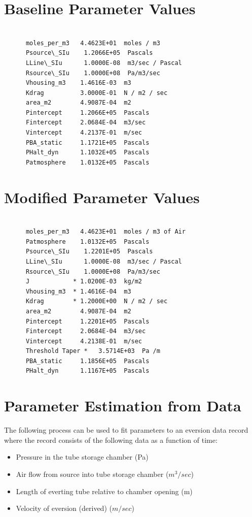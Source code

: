\documentclass[letterpaper]{article}
\begin{document}
\clearpage

\section{Baseline Parameter Values}\label{baselineParms}
\begin{verbatim}

      moles_per_m3   4.4623E+01  moles / m3
      Psource\_SIu    1.2066E+05  Pascals
      LLine\_SIu      1.0000E-08  m3/sec / Pascal
      Rsource\_SIu    1.0000E+08  Pa/m3/sec
      Vhousing_m3    1.4616E-03  m3
      Kdrag          3.0000E-01  N / m2 / sec
      area_m2        4.9087E-04  m2
      Pintercept     1.2066E+05  Pascals
      Fintercept     2.0684E-04  m3/sec
      Vintercept     4.2137E-01  m/sec
      PBA_static     1.1721E+05  Pascals
      PHalt_dyn      1.1032E+05  Pascals
      Patmosphere    1.0132E+05  Pascals

\end{verbatim}


\section{Modified Parameter Values}\label{modParams}
\begin{verbatim}

      moles_per_m3   4.4623E+01  moles / m3 of Air
      Patmosphere    1.0132E+05  Pascals
      Psource\_SIu    1.2201E+05  Pascals
      LLine\_SIu      1.0000E-08  m3/sec / Pascal
      Rsource\_SIu    1.0000E+08  Pa/m3/sec
      J            * 1.0200E-03  kg/m2
      Vhousing_m3  * 1.4616E-04  m3
      Kdrag        * 1.2000E+00  N / m2 / sec
      area_m2        4.9087E-04  m2
      Pintercept     1.2201E+05  Pascals
      Fintercept     2.0684E-04  m3/sec
      Vintercept     4.2138E-01  m/sec
      Threshold Taper *   3.5714E+03  Pa /m
      PBA_static     1.1856E+05  Pascals
      PHalt_dyn      1.1167E+05  Pascals

\end{verbatim}

\section{Parameter Estimation from Data}

The following process can be used to fit parameters to an eversion data record where the record consists of
the following data as a function of time:

\begin{itemize}
    \item Pressure in the tube storage chamber (Pa)
    \item Air flow from source into tube storage chamber ($m^3/sec$)
    \item Length of everting tube relative to chamber opening (m)
    \item Velocity of eversion (derived) ($m/sec$)
\end{itemize}
\end{document}
